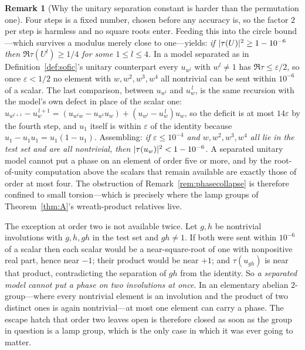 \documentclass[11pt]{amsart}
\theoremstyle{definition}
\newtheorem{remark}[theorem]{Remark}
\theoremstyle{plain}
\newcommand{\eps}{\varepsilon}
\DeclarePairedDelimiter{\abs}{\lvert}{\rvert}
\begin{document}
\begin{remark}[Why the unitary separation constant is harder than the permutation one]
Four steps is a fixed number, chosen before any accuracy is, so the factor \(2\) per step is harmless and no square roots enter.  Feeding this into the circle bound---which survives a modulus merely close to one---yields: \emph{if \(\abs{\tau(U)}^2\geq1-10^{-6}\) then \(\Re\tau(U^l)\geq1/4\) for some \(1\leq l\leq4\).}  In a model separated as in Definition~\ref{def:sofic}'s unitary counterpart every \(u_{w^l}\) with \(w^l\neq1\) has \(\Re\tau\leq\eps/2\), so once \(\eps<1/2\) no element with \(w,w^2,w^3,w^4\) all nontrivial can be sent within \(10^{-6}\) of a scalar.  The last comparison, between \(u_{w^l}\) and \(u_w^{\,l}\), is the same recursion with the model's own defect in place of the scalar one: \(u_{w^{l+1}}-u_w^{\,l+1}=(u_{w^lw}-u_{w^l}u_w)+(u_{w^l}-u_w^{\,l})u_w\), so the deficit is at most \(14\eps\) by the fourth step, and \(u_1\) itself is within \(\eps\) of the identity because \(u_1-u_1u_1=u_1(1-u_1)\).  Assembling: \emph{if \(\eps\leq10^{-4}\) and \(w,w^2,w^3,w^4\) all lie in the test set and are all nontrivial, then \(\abs{\tau(u_w)}^2<1-10^{-6}\).}  A separated unitary model cannot put a phase on an element of order five or more, and by the root-of-unity computation above the scalars that remain available are exactly those of order at most four.  The obstruction of Remark~\ref{rem:phasecollapse} is therefore confined to small torsion---which is precisely where the lamp groups of Theorem~\ref{thm:A}'s wreath-product relatives live.

The exception at order two is not available twice.  Let \(g,h\) be nontrivial involutions with \(g,h,gh\) in the test set and \(gh\neq1\).  If both were sent within \(10^{-6}\) of a scalar then each scalar would be a near-square-root of one with nonpositive real part, hence near \(-1\); their product would be near \(+1\); and \(\tau(u_{gh})\) is near that product, contradicting the separation of \(gh\) from the identity.  So \emph{a separated model cannot put a phase on two involutions at once}.  In an elementary abelian \(2\)-group---where every nontrivial element is an involution and the product of two distinct ones is again nontrivial---at most one element can carry a phase.  The escape hatch that order two leaves open is therefore closed as soon as the group in question is a lamp group, which is the only case in which it was ever going to matter.


\end{remark}
\end{document}
